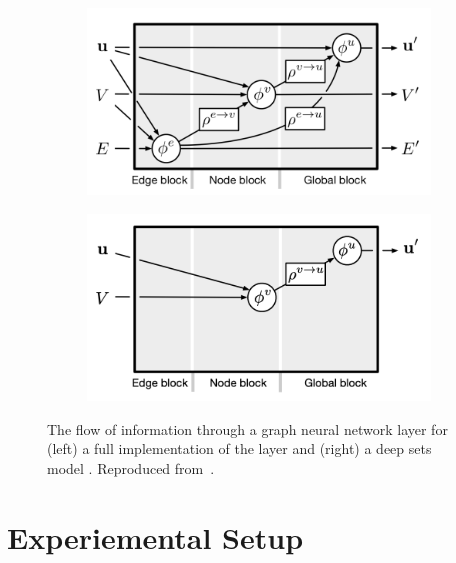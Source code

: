 \begin{figure}[!htbp]
    \centering
    \begin{subfigure}[b]{0.48\textwidth}
        \centering
        \includegraphics[width=\textwidth]{chapters/gnn_tagger/figs/gn_full.png}
    \end{subfigure}
    \quad
    \begin{subfigure}[b]{0.48\textwidth}
        \centering
        \includegraphics[width=\textwidth]{chapters/gnn_tagger/figs/gn_deepset.png}
    \end{subfigure}
    \caption{
        The flow of information through a graph neural network layer for (left) a full implementation of the layer and (right) a deep sets model \cite{zaheer2018deep}.
        Reproduced from~.
    }
    \label{fig:gnn_net_diags}
\end{figure}



\section{Experiemental Setup}\label{sec:experimental_setup}

